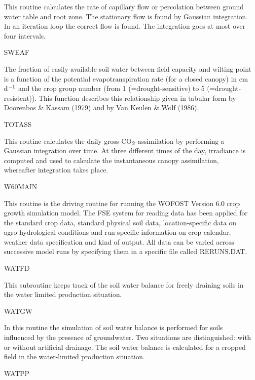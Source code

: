 \documentclass[11pt]{article}
\begin{document}
\begin{indenting}{2.54cm}
This routine calculates the rate of capillary flow or percolation between
ground water table and root zone. The stationary flow is found by Gaussian
integration. In an iteration loop the correct flow is found. The integration
goes at most over four intervals.
\end{indenting}
SWEAF
\testlastline

\begin{indenting}{2.54cm}
The fraction of easily available soil water between field capacity and
wilting point is a function of the potential evapotranspiration rate (for a
closed canopy) in cm d$^{{\rm -1}}$ and the crop group number (from 1 {\nobreak}(=drought-sensitive) to 5 (=drought-resistent)). This function describes this relation\-ship given in tabular form by Doorenbos \& Kassam (1979) and by Van
Keulen \& Wolf (1986).
\end{indenting}
TOTASS
\testlastline

\begin{indenting}{2.54cm}
This routine calculates the daily gross CO$_{{\rm 2}}$ assimilation by performing a
Gaussian integration over time. At three different times of the day, irra\-diance is computed and used to calculate the instantaneous canopy assimila\-tion, whereafter integration takes place. 
\end{indenting}
W60MAIN
\testlastline

\begin{indenting}{2.54cm}
This routine is the driving routine for running the WOFOST Version 6.0
crop growth simulation model. The FSE system for reading data has been
applied for the standard crop data, standard physical soil data, location-specific data on agro-hydrological conditions and run specific information
on crop-calendar, weather data specification and kind of output. All data
can be varied across successive model runs by specify\-ing them in a specific
file called RERUNS.DAT.
\end{indenting}
WATFD
\testlastline

\begin{indenting}{2.54cm}
This subroutine keeps track of the soil water balance for freely draining
soils in the water limited production situation.
\end{indenting}
WATGW
\testlastline

\begin{indenting}{2.54cm}
In this routine the simulation of soil water balance is performed for soils
influenced by the presence of groundwater. Two situations are distin\-guished: with or without artificial drainage. The soil water balance is
calculated for a cropped field in the water-limited production situa\-tion.
\end{indenting}
WATPP
\testlastline
\end{document}
